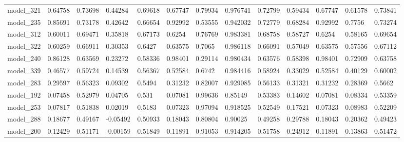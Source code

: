 \begin{tabular}{lllllllllllll}
model\_321     & 0.64758     & 0.73698        & 0.44284      & 0.69618          & 0.67747              & 0.79934              & 0.976741     & 0.72799           & 0.59434            & 0.67747         & 0.61578     & 0.73841      \\
model\_235     & 0.85691     & 0.73178        & 0.42642      & 0.66654          & 0.92992              & 0.53555              & 0.942032     & 0.72779           & 0.68284            & 0.92992         & 0.7756      & 0.73274      \\
model\_312     & 0.60011     & 0.69471        & 0.35818      & 0.67173          & 0.6254               & 0.76769              & 0.983381     & 0.68758           & 0.58727            & 0.6254          & 0.58165     & 0.69654      \\
model\_322     & 0.60259     & 0.66911        & 0.30353      & 0.6427           & 0.63575              & 0.7065               & 0.986118     & 0.66091           & 0.57049            & 0.63575         & 0.57556     & 0.67112      \\
model\_240     & 0.86128     & 0.63569        & 0.23272      & 0.58336          & 0.98401              & 0.29114              & 0.980434     & 0.63576           & 0.58398            & 0.98401         & 0.72909     & 0.63758      \\
model\_339     & 0.46577     & 0.59724        & 0.14539      & 0.56367          & 0.52584              & 0.6742               & 0.984416     & 0.58924           & 0.33029            & 0.52584         & 0.40129     & 0.60002      \\
model\_283     & 0.29597     & 0.56323        & 0.09302      & 0.5494           & 0.31232              & 0.82007              & 0.929085     & 0.56133           & 0.31321            & 0.31232         & 0.28369     & 0.5662       \\
model\_192     & 0.07458     & 0.52979        & 0.04705      & 0.531            & 0.07081              & 0.99636              & 0.85149      & 0.53383           & 0.14602            & 0.07081         & 0.08334     & 0.53359      \\
model\_253     & 0.07817     & 0.51838        & 0.02019      & 0.5183           & 0.07323              & 0.97094              & 0.918525     & 0.52549           & 0.17521            & 0.07323         & 0.08983     & 0.52209      \\
model\_288     & 0.18677     & 0.49167        & -0.05492     & 0.50933          & 0.18043              & 0.80804              & 0.90025      & 0.49258           & 0.29788            & 0.18043         & 0.20362     & 0.49423      \\
model\_200     & 0.12429     & 0.51171        & -0.00159     & 0.51849          & 0.11891              & 0.91053              & 0.914205     & 0.51758           & 0.24912            & 0.11891         & 0.13863     & 0.51472
\end{tabular}